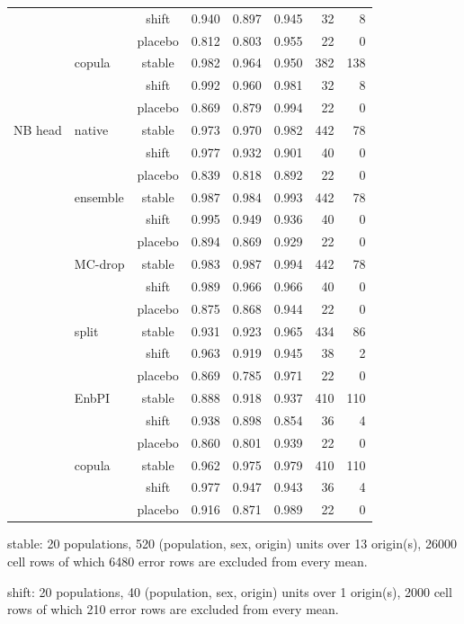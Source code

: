 {\begin{longtable}{@{}llcrrrrr@{}}
 &  & shift & 0.940 & 0.897 & 0.945 & 32 & 8 \\
 &  & placebo & 0.812 & 0.803 & 0.955 & 22 & 0 \\
 & copula & stable & 0.982 & 0.964 & 0.950 & 382 & 138 \\
 &  & shift & 0.992 & 0.960 & 0.981 & 32 & 8 \\
 &  & placebo & 0.869 & 0.879 & 0.994 & 22 & 0 \\
\addlinespace[2pt]
NB head & native & stable & 0.973 & 0.970 & 0.982 & 442 & 78 \\
 &  & shift & 0.977 & 0.932 & 0.901 & 40 & 0 \\
 &  & placebo & 0.839 & 0.818 & 0.892 & 22 & 0 \\
 & ensemble & stable & 0.987 & 0.984 & 0.993 & 442 & 78 \\
 &  & shift & 0.995 & 0.949 & 0.936 & 40 & 0 \\
 &  & placebo & 0.894 & 0.869 & 0.929 & 22 & 0 \\
 & MC-drop & stable & 0.983 & 0.987 & 0.994 & 442 & 78 \\
 &  & shift & 0.989 & 0.966 & 0.966 & 40 & 0 \\
 &  & placebo & 0.875 & 0.868 & 0.944 & 22 & 0 \\
 & split & stable & 0.931 & 0.923 & 0.965 & 434 & 86 \\
 &  & shift & 0.963 & 0.919 & 0.945 & 38 & 2 \\
 &  & placebo & 0.869 & 0.785 & 0.971 & 22 & 0 \\
 & EnbPI & stable & 0.888 & 0.918 & 0.937 & 410 & 110 \\
 &  & shift & 0.938 & 0.898 & 0.854 & 36 & 4 \\
 &  & placebo & 0.860 & 0.801 & 0.939 & 22 & 0 \\
 & copula & stable & 0.962 & 0.975 & 0.979 & 410 & 110 \\
 &  & shift & 0.977 & 0.947 & 0.943 & 36 & 4 \\
 &  & placebo & 0.916 & 0.871 & 0.989 & 22 & 0 \\
\end{longtable}
\noindent\begin{minipage}{\linewidth}\scriptsize\raggedright
\noindent stable: 20 populations, 520 (population, sex, origin) units over 13 origin(s), 26000 cell rows of which 6480 error rows are excluded from every mean.\par
\noindent shift: 20 populations, 40 (population, sex, origin) units over 1 origin(s), 2000 cell rows of which 210 error rows are excluded from every mean.\par

\end{minipage}}
